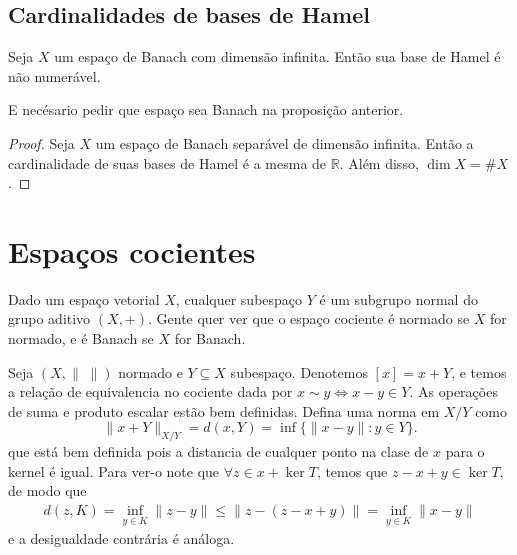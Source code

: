 \documentclass[portuguese]{article}
\theoremstyle{definition}
\newcommand{\R}{\mathbb{R}}
\begin{document}
	\subsection{Cardinalidades de bases de Hamel}
	\begin{prop}
		Seja $X$ um espaço de Banach com dimensão infinita. Então sua base de Hamel é não numerável.
	\end{prop}
	\begin{obs}
		E necésario pedir que espaço sea Banach na proposição anterior.
	\end{obs}
	\begin{proof}
		Seja $X$ um espaço de Banach separável de dimensão infinita. Então a cardinalidade de suas bases de Hamel é a mesma de $\R$. Além disso, $\dim X=\# X$.
	\end{proof}
	
	\section{Espaços cocientes}
	Dado um espaço vetorial $X$, cualquer subespaço $Y$ é um subgrupo normal do grupo aditivo $(X,+)$. Gente quer ver que o espaço cociente é normado se $X$ for normado, e é Banach se $X$ for Banach.
	
	Seja $(X,\|\;\|)$ normado e $Y\subseteq X$ subespaço. Denotemos $[x]=x+Y$, e temos a relação de equivalencia no cociente dada por $x\sim y\iff x-y\in Y$. As operações de suma e produto escalar estão bem definidas. Defina uma norma em $X/Y$ como
	\[\| x+Y\|_{X/Y}=d(x,Y)=\inf\{\| x-y\|:y\in Y\}.\]
	que está bem definida pois a distancia de cualquer ponto na clase de $x$ para o kernel é igual. Para ver-o note que $\forall z\in x+\ker T$, temos que $z-x+y\in\ker T$, de modo que
	\begin{gather*}
		d(z,K)=\inf_{y\in K}\| z-y\|\leq\| z-(z-x+y)\|=\inf_{y\in K}\| x-y\|
	\end{gather*}
	e a desigualdade contrária é análoga.
	
\end{document}

